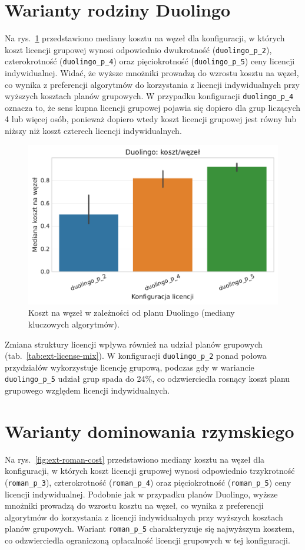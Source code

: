 \section{Warianty rodziny Duolingo}
Na rys.~\ref{fig:ext-duolingo-cost} przedstawiono mediany kosztu na węzeł dla konfiguracji, w których koszt licencji grupowej wynosi odpowiednio dwukrotność (\texttt{duolingo\_p\_2}), czterokrotność (\texttt{duolingo\_p\_4}) oraz pięciokrotność (\texttt{duolingo\_p\_5}) ceny licencji indywidualnej. Widać, że wyższe mnożniki prowadzą do wzrostu kosztu na węzeł, co wynika z preferencji algorytmów do korzystania z licencji indywidualnych przy wyższych kosztach planów grupowych. W przypadku konfiguracji \texttt{duolingo\_p\_4} oznacza to, że sens kupna licencji grupowej pojawia się dopiero dla grup liczących 4 lub więcej osób, ponieważ dopiero wtedy koszt licencji grupowej jest równy lub niższy niż koszt czterech licencji indywidualnych.

\begin{figure}[H]
  \centering
  \includegraphics[width=0.6\linewidth]{assets/figures/extensions/static/duolingo_cost_per_node_comparison.pdf}
  \caption{Koszt na węzeł w zależności od planu Duolingo (mediany kluczowych algorytmów).}
  \label{fig:ext-duolingo-cost}
\end{figure}

Zmiana struktury licencji wpływa również na udział planów grupowych (tab.~\ref{tab:ext-license-mix}). W konfiguracji \texttt{duolingo\_p\_2} ponad połowa przydziałów wykorzystuje licencję grupową, podczas gdy w wariancie \texttt{duolingo\_p\_5} udział grup spada do 24\%, co odzwierciedla rosnący koszt planu grupowego względem licencji indywidualnych.


\section{Warianty dominowania rzymskiego}
Na rys.~\ref{fig:ext-roman-cost} przedstawiono mediany kosztu na węzeł dla konfiguracji, w których koszt licencji grupowej wynosi odpowiednio trzykrotność (\texttt{roman\_p\_3}), czterokrotność (\texttt{roman\_p\_4}) oraz pięciokrotność (\texttt{roman\_p\_5}) ceny licencji indywidualnej. Podobnie jak w przypadku planów Duolingo, wyższe mnożniki prowadzą do wzrostu kosztu na węzeł, co wynika z preferencji algorytmów do korzystania z licencji indywidualnych przy wyższych kosztach planów grupowych. Wariant \texttt{roman\_p\_5} charakteryzuje się najwyższym kosztem, co odzwierciedla ograniczoną opłacalność licencji grupowych w tej konfiguracji.

